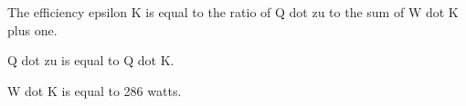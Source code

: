 The efficiency epsilon K is equal to the ratio of Q dot zu to the sum of W dot K plus one.

Q dot zu is equal to Q dot K.

W dot K is equal to 286 watts.